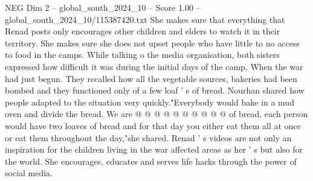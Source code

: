 \begin{textsample}{NEG Dim 2 – global\_south\_2024\_10 – Score 1.00 – global\_south\_2024\_10/115387420.txt}
She makes sure that everything that Renad posts only encourages other children and elders to watch it in their territory.
She makes sure she does not upset people who have little to no access to food in the camps.
While talking o the media organisation, both sisters expressed how difficult it was during the initial days of the camp, When the war had just begun.
They recalled how all the vegetable sources, bakeries had been bombed and they functioned only of a few loaf ' s of bread.
Nourhan shared how people adapted to the situation very quickly."Everybody would bake in a mud oven and divide the bread.
We are @ @ @ @ @ @ @ @ @ @ of bread, each person would have two loaves of bread and for that day you either eat them all at once or eat them throughout the day,"she shared.
Renad ' s videos are not only an inspiration for the children living in the war affected areas as her ' s but also for the world.
She encourages, educates and serves life hacks through the power of social media.

\end{textsample}

